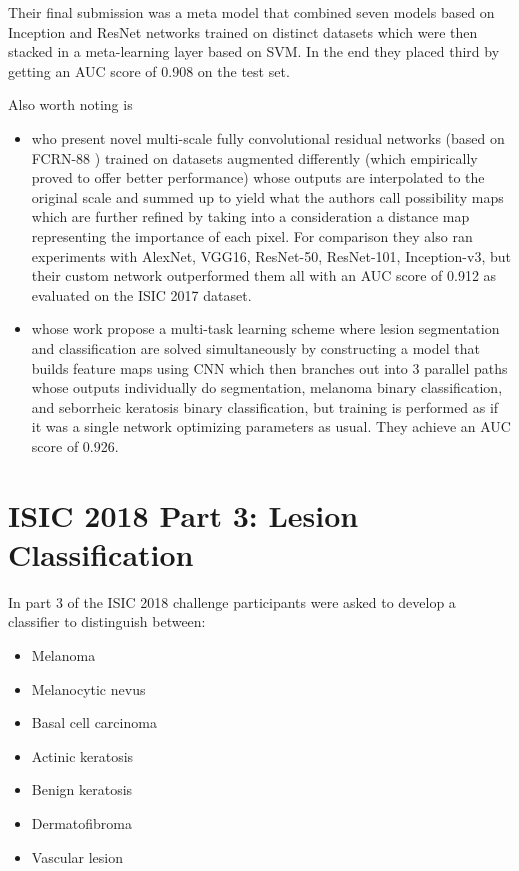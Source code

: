 Their final submission was a meta model that combined seven models based on Inception and ResNet networks trained on distinct datasets which were then stacked in a meta-learning layer based on SVM. In the end they placed third by getting an AUC score of 0.908 on the test set.

Also worth noting is

\begin{itemize}
    \item \citeauthor{isic2017li} \cite{isic2017li} who present novel multi-scale fully convolutional residual networks (based on FCRN-88 \cite{fcrn}) trained on datasets augmented differently (which empirically proved to offer better performance) whose outputs are interpolated to the original scale and summed up to yield what the authors call possibility maps which are further refined by taking into a consideration a distance map representing the importance of each pixel. For comparison they also ran experiments with AlexNet, VGG16, ResNet-50, ResNet-101, Inception-v3, but their custom network outperformed them all with an AUC score of 0.912 as evaluated on the ISIC 2017 dataset.
    \item \citeauthor{yang2017} \cite{yang2017} whose work propose a multi-task learning scheme where lesion segmentation and classification are solved simultaneously by constructing a model that builds feature maps using \ac{CNN} which then branches out into 3 parallel paths whose outputs individually do segmentation, melanoma binary classification, and seborrheic keratosis binary classification, but training is performed as if it was a single network optimizing parameters as usual. They achieve an AUC score of 0.926.
\end{itemize}

\section{ISIC 2018 Part 3: Lesion Classification}

In part 3 of the ISIC 2018 challenge participants were asked to develop a classifier to distinguish between:

\begin{itemize}
    \item Melanoma
    \item Melanocytic nevus
    \item Basal cell carcinoma
    \item Actinic keratosis
    \item Benign keratosis
    \item Dermatofibroma
    \item Vascular lesion
\end{itemize}

